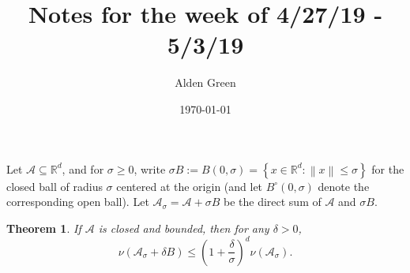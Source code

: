 \documentclass{article}
\newcommand{\Reals}{\mathbb{R}}
\newcommand{\norm}[1]{\left\lVert#1\right\rVert}
\newcommand{\set}[1]{\left\{#1\right\}}
\newcommand{\Rd}{\Reals^d}
\newcommand{\Aset}{\mathcal{A}}
\newcommand{\Asig}{\Aset_{\sigma}}
\newcommand{\1}{\mathbf{1}}
\theoremstyle{alden}
\theoremstyle{aldenthm}
\newtheorem{theorem}{Theorem}
\theoremstyle{remark}
\begin{document}
	
\title{Notes for the week of 4/27/19 - 5/3/19}
\author{Alden Green}
\date{\today}
\maketitle

Let $\Aset \subseteq \Reals^d$, and for $\sigma \geq 0$, write $\sigma B := B(0,\sigma) = \set{x \in \Rd: \norm{x} \leq \sigma}$ for the closed ball of radius $\sigma$ centered at the origin (and let $B^{\circ}(0,\sigma)$ denote the corresponding open ball). Let $\Asig = \Aset + \sigma B$ be the direct sum of $\Aset$ and $\sigma B$.

\begin{theorem}
	\label{thm: expansion_volume}
	If $\Aset$ is closed and bounded, then for any $\delta > 0$,
	\begin{equation*}
	\nu(\Asig + \delta B) \leq \left(1 + \frac{\delta}{\sigma}\right)^d \nu(\Asig).
	\end{equation*}
\end{theorem}
\end{document}
